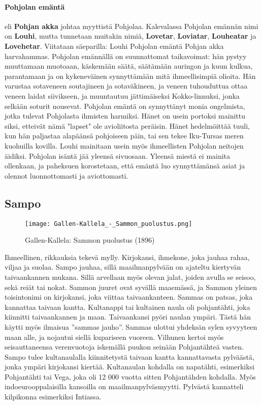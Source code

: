   \paragraph{Pohjolan emäntä} eli \textbf{Pohjan akka} johtaa myyttistä Pohjolaa. Kalevalassa 
  Pohjolan emännän nimi on \textbf{Louhi}, mutta tunnetaan muitakin nimiä, \textbf{Lovetar}, 
  \textbf{Loviatar}, \textbf{Louheatar} ja \textbf{Lovehetar}. Viitataan säeparilla: Louhi 
  Pohjolan emäntä Pohjan akka harvahammas. Pohjolan emännällä on suunnattomat taikavoimat: hän 
  pystyy muuttamaan muotoaan, käskemään säätä, säätämään auringon ja kuun kulkua, parantamaan 
  ja on kykeneväinen synnyttämään mitä ihmeellisimpiä olioita. Hän varustaa sotaveneen soutajineen 
  ja sotaväkineen, ja veneen tuhouduttua ottaa veneen laidat siivikseen, ja muuntautuu 
  jättimäiseksi Kokko-linnuksi, jonka selkään soturit nousevat. Pohjolan emäntä on synnyttänyt 
  monia ongelmista, jotka tulevat Pohjolasta ihmisten harmiksi. Hänet on usein portoksi mainittu 
  siksi, etteivät nämä "lapset" ole avioliitosta peräisin. Hänet hedelmöittää tuuli, kun hän 
  paljastaa alapäänsä pohjoiseen päin, tai sen tekee Iku-Tursas meren kuohuilla kovilla. Louhi 
  mainitaan usein myös ihmeellisten Pohjolan neitojen äidiksi. Pohjolan isäntä jää yleensä 
  sivuosaan. Yleensä miestä ei mainita ollenkaan, ja paheksuen korostetaan, että emäntä luo 
  synnyttämänsä asiat ja olennot luonnottomasti ja aviottomasti. 
 


\subsection{Sampo}
  \begin{figure}[!hb]
    \caption{Gallen-Kallela: Sammon puolustus (1896)}
    \centering
    \texttt{[image: Gallen-Kallela\_-\_Sammon\_puolustus.png]}
  \end{figure}

  Ihmeellinen, rikkauksia tekevä mylly. Kirjokansi, ihmekone, joka jauhaa rahaa, viljaa ja 
  suolaa. Sampo jauhaa, sillä maailmanpylvään on ajateltu kiertyvän taivaankannen mukana. Sillä 
  arvellaan myös olevan jalat, joiden avulla se seisoo, sekä reiät tai nokat. Sammon juuret ovat 
  syvällä maaemässä, ja Sammon yleinen toisintonimi on kirjokansi, joka viittaa taivaankanteen. 
  Sammas on patsas, joka kannattaa taivaan kantta. Kultanappi tai kultainen naula oli pohjantähti, 
  joka kiinnitti taivaankannen ja maan. Taivaankansi pyöri naulan ympäri. Tästä hän käytti myös 
  ilmaisua ”sammas jauho”. Sammas ulottui yhdeksän sylen syvyyteen maan alle, ja nojautui siellä 
  kupariseen vuoreen. Vilhunen kertoi myös seisauttaneensa verenvuotoja iskemällä puukon seinään 
  Pohjantähteä vasten. Sampo tulee kultanaulalla kiinnitetystä taivaan kantta kannattavasta 
  pylväästä, jonka ympäri kirjokansi kiertää. Kultanaulan kohdalla on napatähti, esimerkiksi 
  Pohjantähti tai Vega, joka oli 12 000 vuotta sitten Pohjantähden kohdalla. Myös 
  indoeurooppalaisilla kansoilla on maailmanpylväsmyytti. Pylvästä kannatteli kilpikonna 
  esimerkiksi Intiassa.

